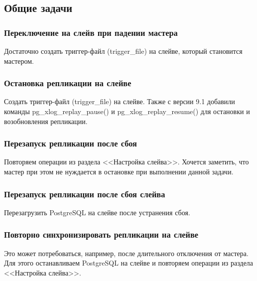 \subsection{Общие задачи}
\subsubsection{Переключение на слейв при падении мастера}
Достаточно создать триггер-файл (trigger\_file) на слейве, который становится мастером.

\subsubsection{Остановка репликации на слейве}
Создать триггер-файл (trigger\_file) на слейве. Также с версии 9.1 добавили команды pg\_xlog\_replay\_pause() и pg\_xlog\_replay\_resume() для остановки и возобновления репликации.

\subsubsection{Перезапуск репликации после сбоя}
Повторяем операции из раздела <<Настройка слейва>>. Хочется заметить, что мастер при этом не нуждается в остановке при выполнении данной задачи.

\subsubsection{Перезапуск репликации после сбоя слейва}
Перезагрузить PostgreSQL на слейве после устранения сбоя.

\subsubsection{Повторно синхронизировать репликации на слейве}
Это может потребоваться, например, после длительного отключения от мастера.
Для этого останавливаем PostgreSQL на слейве и повторяем операции из раздела <<Настройка слейва>>.
